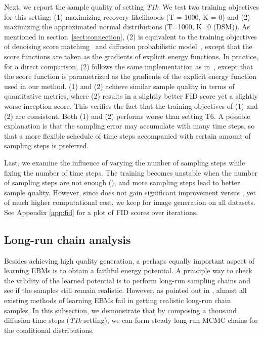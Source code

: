 \documentclass{article} \usepackage{iclr2021_conference,times}
\def\secref#1{section~\ref{#1}}
\begin{document}
Next, we report the sample quality of setting {\em T1k}. We test two training objectives for this setting: (1) maximizing recovery likelihoods (T = 1000, K = 0) and (2) maximizing the approximated normal distributions (T=1000, K=0 (DSM)). As mentioned in \secref{sect:connection}, (2) is equivalent to the training objectives of denoising score matching~\citep{song2019generative,song2020improved} and diffusion probabilistic model~\citep{ho2020denoising}, except that the score functions are taken as the gradients of explicit energy functions. In practice, for a direct comparison, (2) follows the same implementation as in~\cite{ho2020denoising}, except that the score function is parametrized as the gradients of the explicit energy function used in our method. (1) and (2) achieve similar sample quality in terms of quantitative metrics, where (2) results in a slightly better FID score yet a slightly worse inception score. This verifies the fact that the training objectives of (1) and (2) are consistent. Both (1) and (2) performs worse than setting T6. A possible explanation is that the sampling error may accumulate with many time steps, so that a more flexible schedule of time steps accompanied with certain amount of sampling  steps is preferred. 

Last, we examine the influence of varying the number of sampling steps while fixing the number of time steps. The training becomes unstable when the number of sampling steps are not enough (), and more sampling steps lead to better sample quality. However, since  does not gain significant improvement versus , yet of much higher computational cost, we keep  for image generation on all datasets. See Appendix \ref{app:fid} for a plot of FID scores over iterations. 

\subsection{Long-run chain analysis} \label{sect:long-run}
Besides achieving high quality generation, a perhaps equally important aspect of learning EBMs is to obtain a faithful energy potential. A principle way to check the validity of the learned potential is to perform long-run sampling chains and see if the samples still remain realistic. However, as pointed out in \citet{nijkamp2019anatomy}, almost all existing methods of learning EBMs fail in getting realistic long-run chain samples.  In this subsection, we demonstrate that by composing a thousand diffusion time steps ({\em T1k} setting), we can form steady long-run MCMC chains for the conditional distributions.  
\end{document}
